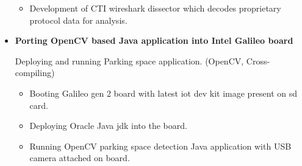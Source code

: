 \documentclass[letterpaper,10pt]{article}
\newcommand{\resitem}[1]{\item #1 \vspace{-2pt}}
\begin{document}
\begin{itemize}
\begin{itemize}
	    \resitem{Development of CTI wireshark dissector which decodes proprietary protocol data for analysis.}
	    
	\end{itemize}
	
\item
    \textbf{Porting OpenCV based Java application into Intel Galileo board}

    Deploying and running Parking space application. (OpenCV, Cross-compiling)

    \begin{itemize}
        \resitem{Booting Galileo gen 2 board with latest iot dev kit image present on sd card.}
        
        \resitem{Deploying Oracle Java jdk into the board.}
        
        \resitem{Running OpenCV parking space detection Java application with USB camera attached on board.}
    
    \end{itemize}

\end{itemize}
\end{document}
